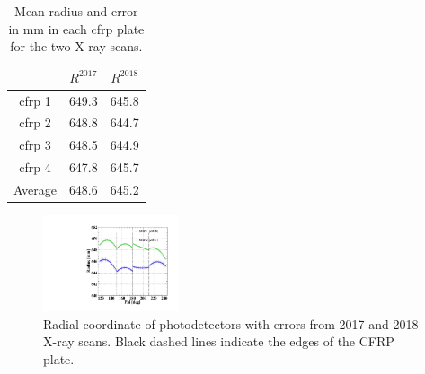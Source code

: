 \begin{table}
\centering
\begin{tabular}{ccc}
 & $R^{2017}$ & $R^{2018}$   \\
\hline
cfrp 1 &  649.3  & 645.8  \\
cfrp 2 &  648.8  & 644.7  \\
cfrp 3 &  648.5  & 644.9  \\
cfrp 4 &  647.8  & 645.7  \\
Average&  648.6  & 645.2  \\
\end{tabular}
\caption{Mean radius and error in mm in each cfrp plate for the two X-ray scans.}
\label{tab:radius}
\end{table}

\begin{figure}
\begin{center}
\includegraphics[width=4cm]{plots/2018/cRadius_1718}
\caption{ Radial coordinate of photodetectors with errors from 2017 and 2018
X-ray scans.  Black dashed lines indicate the edges of the CFRP plate.}
\label{fig:radiuscalculation} 
\end{center}
\end{figure}


